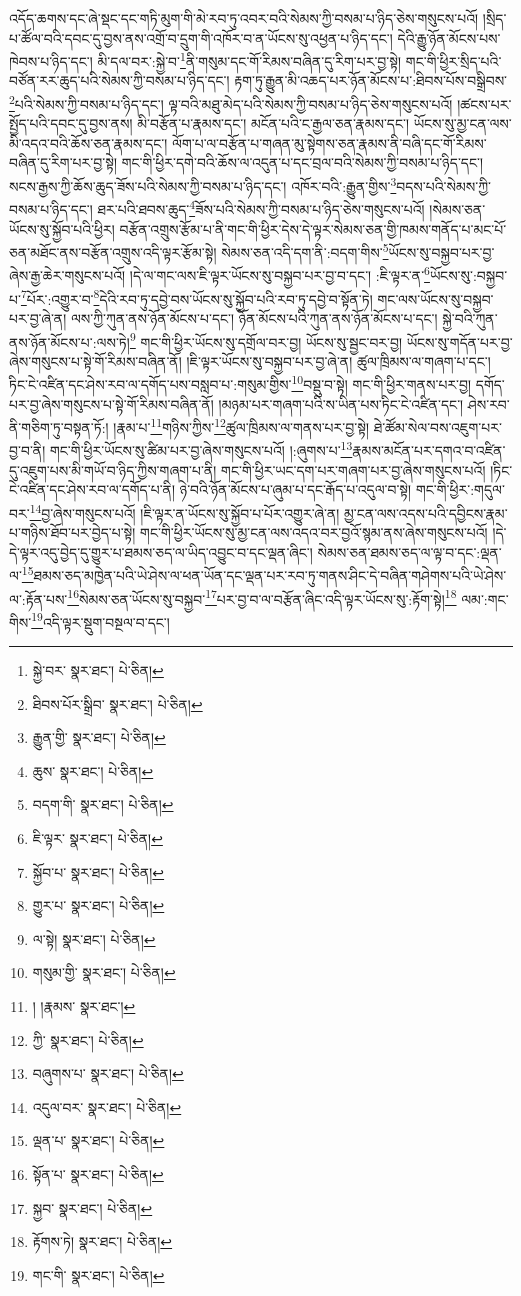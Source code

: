 འདོད་ཆགས་དང་ཞེ་སྡང་དང་གཏི་མུག་གི་མེ་རབ་ཏུ་འབར་བའི་སེམས་ཀྱི་བསམ་པ་ཉིད་ཅེས་གསུངས་པའོ། །སྲིད་པ་ཚོལ་བའི་དབང་དུ་བྱས་ནས་འགྲོ་བ་དྲུག་གི་འཁོར་བ་ན་ཡོངས་སུ་འཕྱན་པ་ཉིད་དང་། དེའི་རྒྱུ་ཉོན་མོངས་པས་ཁེབས་པ་ཉིད་དང་། མི་དལ་བར་:སྐྱེ་བ་\footnote{སྐྱེ་བར་  སྣར་ཐང་།  པེ་ཅིན། }ནི་གསུམ་དང་གོ་རིམས་བཞིན་དུ་རིག་པར་བྱ་སྟེ། གང་གི་ཕྱིར་སྲིད་པའི་བཙོན་རར་ཆུད་པའི་སེམས་ཀྱི་བསམ་པ་ཉིད་དང་། རྟག་ཏུ་རྒྱུན་མི་འཆད་པར་ཉོན་མོངས་པ་:ཐིབས་པོས་བསྒྲིབས་\footnote{ཐིབས་པོར་སྒྲིབ་  སྣར་ཐང་།  པེ་ཅིན། }པའི་སེམས་ཀྱི་བསམ་པ་ཉིད་དང་། ལྟ་བའི་མཐུ་མེད་པའི་སེམས་ཀྱི་བསམ་པ་ཉིད་ཅེས་གསུངས་པའོ། །ཚངས་པར་སྤྱོད་པའི་དབང་དུ་བྱས་ནས། མི་བརྩོན་པ་རྣམས་དང་། མངོན་པའི་ང་རྒྱལ་ཅན་རྣམས་དང་། ཡོངས་སུ་མྱ་ངན་ལས་མི་འདའ་བའི་ཆོས་ཅན་རྣམས་དང་། ལོག་པ་ལ་བརྩོན་པ་གཞན་མུ་སྟེགས་ཅན་རྣམས་ནི་བཞི་དང་གོ་རིམས་བཞིན་དུ་རིག་པར་བྱ་སྟེ། གང་གི་ཕྱིར་དགེ་བའི་ཆོས་ལ་འདུན་པ་དང་བྲལ་བའི་སེམས་ཀྱི་བསམ་པ་ཉིད་དང་། སངས་རྒྱས་ཀྱི་ཆོས་ཆུད་ཟོས་པའི་སེམས་ཀྱི་བསམ་པ་ཉིད་དང་། འཁོར་བའི་:རྒྱུན་གྱིས་\footnote{རྒྱུན་གྱི་  སྣར་ཐང་།  པེ་ཅིན། }བདས་པའི་སེམས་ཀྱི་བསམ་པ་ཉིད་དང་། ཐར་པའི་ཐབས་ཆུད་\footnote{ཆུས་  སྣར་ཐང་།  པེ་ཅིན། }ཟོས་པའི་སེམས་ཀྱི་བསམ་པ་ཉིད་ཅེས་གསུངས་པའོ། །སེམས་ཅན་ཡོངས་སུ་སྐྱོབ་པའི་ཕྱིར། བརྩོན་འགྲུས་རྩོམ་པ་ནི་གང་གི་ཕྱིར་དེས་དེ་ལྟར་སེམས་ཅན་གྱི་ཁམས་གནོད་པ་མང་པོ་ཅན་མཐོང་ནས་བརྩོན་འགྲུས་འདི་ལྟར་རྩོམ་སྟེ། སེམས་ཅན་འདི་དག་ནི་:བདག་གིས་\footnote{བདག་གི་  སྣར་ཐང་།  པེ་ཅིན། }ཡོངས་སུ་བསྐྱབ་པར་བྱ་ཞེས་རྒྱ་ཆེར་གསུངས་པའོ། །དེ་ལ་གང་ལས་ཇི་ལྟར་ཡོངས་སུ་བསྐྱབ་པར་བྱ་བ་དང་། :ཇི་ལྟར་ན་\footnote{ཇི་ལྟར་  སྣར་ཐང་།  པེ་ཅིན། }ཡོངས་སུ་:བསྐྱབ་པ་\footnote{སྐྱོབ་པ་  སྣར་ཐང་།  པེ་ཅིན། }པོར་:འགྱུར་བ་\footnote{གྱུར་པ་  སྣར་ཐང་།  པེ་ཅིན། }དེའི་རབ་ཏུ་དབྱེ་བས་ཡོངས་སུ་སྐྱོབ་པའི་རབ་ཏུ་དབྱེ་བ་སྟོན་ཏེ། གང་ལས་ཡོངས་སུ་བསྐྱབ་པར་བྱ་ཞེ་ན། ལས་ཀྱི་ཀུན་ནས་ཉོན་མོངས་པ་དང་། ཉོན་མོངས་པའི་ཀུན་ནས་ཉོན་མོངས་པ་དང་། སྐྱེ་བའི་ཀུན་ནས་ཉོན་མོངས་པ་:ལས་ཏེ།\footnote{ལ་སྟེ།  སྣར་ཐང་།  པེ་ཅིན། } གང་གི་ཕྱིར་ཡོངས་སུ་དགྲོལ་བར་བྱ། ཡོངས་སུ་སྦྱང་བར་བྱ། ཡོངས་སུ་གདོན་པར་བྱ་ཞེས་གསུངས་པ་སྟེ་གོ་རིམས་བཞིན་ནོ། །ཇི་ལྟར་ཡོངས་སུ་བསྐྱབ་པར་བྱ་ཞེ་ན། ཚུལ་ཁྲིམས་ལ་གཞག་པ་དང་། ཏིང་ངེ་འཛིན་དང་ཤེས་རབ་ལ་དགོད་པས་བསླབ་པ་:གསུམ་གྱིས་\footnote{གསུམ་གྱི་  སྣར་ཐང་།  པེ་ཅིན། }བསྡུ་བ་སྟེ། གང་གི་ཕྱིར་གནས་པར་བྱ། དགོད་པར་བྱ་ཞེས་གསུངས་པ་སྟེ་གོ་རིམས་བཞིན་ནོ། །མཉམ་པར་གཞག་པའི་ས་ཡིན་པས་ཏིང་ངེ་འཛིན་དང་། ཤེས་རབ་ནི་གཅིག་ཏུ་བསྟན་ཏོ:། །རྣམ་པ་\footnote{། །རྣམས་  སྣར་ཐང་། }གཉིས་ཀྱིས་\footnote{ཀྱི་  སྣར་ཐང་།  པེ་ཅིན། }ཚུལ་ཁྲིམས་ལ་གནས་པར་བྱ་སྟེ། ཐེ་ཚོམ་སེལ་བས་འཇུག་པར་བྱ་བ་ནི། གང་གི་ཕྱིར་ཡོངས་སུ་ཚིམ་པར་བྱ་ཞེས་གསུངས་པའོ། །:ཞུགས་པ་\footnote{བཞུགས་པ་  སྣར་ཐང་།  པེ་ཅིན། }རྣམས་མངོན་པར་དགའ་བ་འཛིན་དུ་འཇུག་པས་མི་གཡོ་བ་ཉིད་ཀྱིས་གཞག་པ་ནི། གང་གི་ཕྱིར་ཡང་དག་པར་གཞག་པར་བྱ་ཞེས་གསུངས་པའོ། །ཏིང་ངེ་འཛིན་དང་ཤེས་རབ་ལ་དགོད་པ་ནི། ཉེ་བའི་ཉོན་མོངས་པ་ཞུམ་པ་དང་རྒོད་པ་འདུལ་བ་སྟེ། གང་གི་ཕྱིར་:གདུལ་བར་\footnote{འདུལ་བར་  སྣར་ཐང་།  པེ་ཅིན། }བྱ་ཞེས་གསུངས་པའོ། །ཇི་ལྟར་ན་ཡོངས་སུ་སྐྱོབ་པ་པོར་འགྱུར་ཞེ་ན། མྱ་ངན་ལས་འདས་པའི་དབྱིངས་རྣམ་པ་གཉིས་ཐོབ་པར་བྱེད་པ་སྟེ། གང་གི་ཕྱིར་ཡོངས་སུ་མྱ་ངན་ལས་འདའ་བར་བྱའོ་སྙམ་ནས་ཞེས་གསུངས་པའོ། །དེ་དེ་ལྟར་འདུ་བྱེད་དུ་གྱུར་པ་ཐམས་ཅད་ལ་ཡིད་འབྱུང་བ་དང་ལྡན་ཞིང་། སེམས་ཅན་ཐམས་ཅད་ལ་ལྟ་བ་དང་:ལྡན་ལ་\footnote{ལྡན་པ་  སྣར་ཐང་།  པེ་ཅིན། }ཐམས་ཅད་མཁྱེན་པའི་ཡེ་ཤེས་ལ་ཕན་ཡོན་དང་ལྡན་པར་རབ་ཏུ་གནས་ཤིང་དེ་བཞིན་གཤེགས་པའི་ཡེ་ཤེས་ལ་:རྟོན་པས་\footnote{སྟོན་པ་  སྣར་ཐང་།  པེ་ཅིན། }སེམས་ཅན་ཡོངས་སུ་བསྐྱབ་\footnote{སྐྱབ་  སྣར་ཐང་།  པེ་ཅིན། }པར་བྱ་བ་ལ་བརྩོན་ཞིང་འདི་ལྟར་ཡོངས་སུ་:རྟོག་སྟེ།\footnote{རྟོགས་ཏེ།  སྣར་ཐང་།  པེ་ཅིན། } ལམ་:གང་གིས་\footnote{གང་གི་  སྣར་ཐང་།  པེ་ཅིན། }འདི་ལྟར་སྡུག་བསྔལ་བ་དང་། 